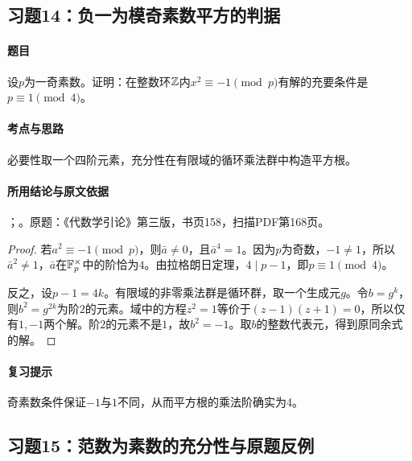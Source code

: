 \subsection{习题14：负一为模奇素数平方的判据}

\label{ex:4:14}

\paragraph{题目}

设$p$为一奇素数。证明：在整数环$\mathbb Z$内$x^2\equiv-1\pmod p$有解的充要条件是$p\equiv1\pmod4$。

\paragraph{考点与思路}

必要性取一个四阶元素，充分性在有限域的循环乘法群中构造平方根。

\paragraph{所用结论与原文依据}

；。原题：《代数学引论》第三版，书页158，扫描PDF第168页。


\begin{proof}

若$a^2\equiv-1\pmod p$，则$\bar a\ne0$，且$\bar a^4=1$。因为$p$为奇数，$-1\ne1$，所以$\bar a^2\ne1$，$\bar a$在$\mathbb F_p^\times$中的阶恰为$4$。由拉格朗日定理，$4\mid p-1$，即$p\equiv1\pmod4$。

反之，设$p-1=4k$。有限域的非零乘法群是循环群，取一个生成元$g$。令$b=g^k$，则$b^2=g^{2k}$为阶$2$的元素。域中的方程$z^2=1$等价于$(z-1)(z+1)=0$，所以仅有$1,-1$两个解。阶$2$的元素不是$1$，故$b^2=-1$。取$b$的整数代表元，得到原同余式的解。

\end{proof}

\paragraph{复习提示}

奇素数条件保证$-1$与$1$不同，从而平方根的乘法阶确实为4。

\subsection{习题15：范数为素数的充分性与原题反例}

